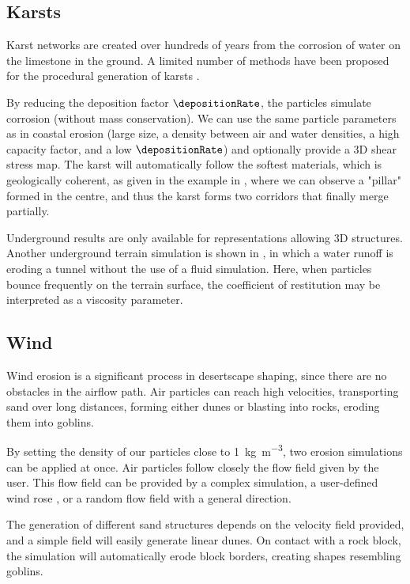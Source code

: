 \subsection{Karsts} 

Karst networks are created over hundreds of years from the corrosion of water on the limestone in the ground. A limited number of methods have been proposed for the procedural generation of karsts \cite{Paris2021}.

By reducing the deposition factor $\depositionRate$, the particles simulate corrosion (without mass conservation). We can use the same particle parameters as in coastal erosion (large size, a density between air and water densities, a high capacity factor, and a low $\depositionRate$) and optionally provide a 3D shear stress map. The karst will automatically follow the softest materials, which is geologically coherent, as given in the example in , where we can observe a "pillar" formed in the centre, and thus the karst forms two corridors that finally merge partially. 

Underground results are only available for representations allowing 3D structures. Another underground terrain simulation is shown in , in which a water runoff is eroding a tunnel without the use of a fluid simulation. Here, when particles bounce frequently on the terrain surface, the coefficient of restitution may be interpreted as a viscosity parameter.

\subsection{Wind}

Wind erosion is a significant process in desertscape shaping, since there are no obstacles in the airflow path. Air particles can reach high velocities, transporting sand over long distances, forming either dunes or blasting into rocks, eroding them into goblins. 

By setting the density of our particles close to \SI{1}{\kilogram\per\cubic\meter}, two erosion simulations can be applied at once. Air particles follow closely the flow field given by the user. This flow field can be provided by a complex simulation, a user-defined wind rose \cite{Paris2019b}, or a random flow field with a general direction. 

The generation of different sand structures depends on the velocity field provided, and a simple field will easily generate linear dunes. On contact with a rock block, the simulation will automatically erode block borders, creating shapes resembling goblins. 

